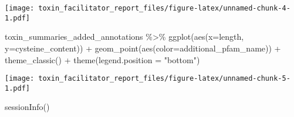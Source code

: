 \documentclass[
]{article}
\newenvironment{Shaded}{\begin{snugshade}}{\end{snugshade}}
\newcommand{\AttributeTok}[1]{\textcolor[rgb]{0.77,0.63,0.00}{#1}}
\newcommand{\FunctionTok}[1]{\textcolor[rgb]{0.00,0.00,0.00}{#1}}
\newcommand{\NormalTok}[1]{#1}
\newcommand{\SpecialCharTok}[1]{\textcolor[rgb]{0.00,0.00,0.00}{#1}}
\newcommand{\StringTok}[1]{\textcolor[rgb]{0.31,0.60,0.02}{#1}}
\begin{document}
\texttt{[image: toxin\_facilitator\_report\_files/figure-latex/unnamed-chunk-4-1.pdf]}

\begin{Shaded}
\begin{Highlighting}[]
\NormalTok{toxin\_summaries\_added\_annotations }\SpecialCharTok{\%\textgreater{}\%} 
  \FunctionTok{ggplot}\NormalTok{(}\FunctionTok{aes}\NormalTok{(}\AttributeTok{x=}\NormalTok{length, }\AttributeTok{y=}\NormalTok{cysteine\_content)) }\SpecialCharTok{+}
  \FunctionTok{geom\_point}\NormalTok{(}\FunctionTok{aes}\NormalTok{(}\AttributeTok{color=}\NormalTok{additional\_pfam\_name)) }\SpecialCharTok{+} 
  \FunctionTok{theme\_classic}\NormalTok{() }\SpecialCharTok{+}
  \FunctionTok{theme}\NormalTok{(}\AttributeTok{legend.position =} \StringTok{"bottom"}\NormalTok{)}
\end{Highlighting}
\end{Shaded}

\texttt{[image: toxin\_facilitator\_report\_files/figure-latex/unnamed-chunk-5-1.pdf]}

\begin{Shaded}
\begin{Highlighting}[]
\FunctionTok{sessionInfo}\NormalTok{()}
\end{Highlighting}
\end{Shaded}
\end{document}
